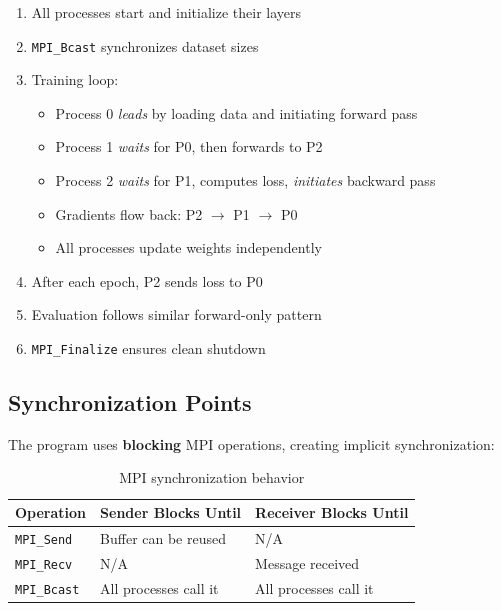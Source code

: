 \documentclass[11pt,a4paper]{article}
\begin{document}
\begin{enumerate}
    \item All processes start and initialize their layers
    \item \texttt{MPI\_Bcast} synchronizes dataset sizes
    \item Training loop:
    \begin{itemize}
        \item Process 0 \textit{leads} by loading data and initiating forward pass
        \item Process 1 \textit{waits} for P0, then forwards to P2
        \item Process 2 \textit{waits} for P1, computes loss, \textit{initiates} backward pass
        \item Gradients flow back: P2 $\rightarrow$ P1 $\rightarrow$ P0
        \item All processes update weights independently
    \end{itemize}
    \item After each epoch, P2 sends loss to P0
    \item Evaluation follows similar forward-only pattern
    \item \texttt{MPI\_Finalize} ensures clean shutdown
\end{enumerate}

\subsection{Synchronization Points}

The program uses \textbf{blocking} MPI operations, creating implicit synchronization:

\begin{table}[h]
\centering
\begin{tabular}{@{}lll@{}}
\toprule
\textbf{Operation} & \textbf{Sender Blocks Until} & \textbf{Receiver Blocks Until} \\
\midrule
\texttt{MPI\_Send} & Buffer can be reused & N/A \\
\texttt{MPI\_Recv} & N/A & Message received \\
\texttt{MPI\_Bcast} & All processes call it & All processes call it \\
\bottomrule
\end{tabular}
\caption{MPI synchronization behavior}
\end{table}

\end{document}
